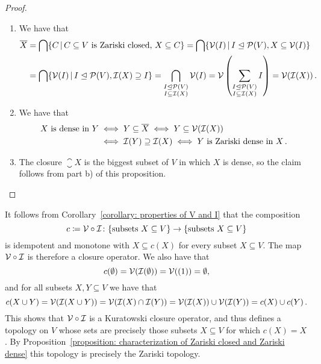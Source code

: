 \begin{proof}
  \leavevmode
  \begin{enumerate}
    \item
      We have that
      \begin{align*}
            \closure{X}
        &=  \bigcap \{ C \suchthat \text{$C \subseteq V$ is Zariski closed, $X \subseteq C$} \}
         =  \bigcap \{ \mc{V}(I) \suchthat I \idealeq \mc{P}(V), X \subseteq \mc{V}(I) \} \\
        &=  \bigcap \{ \mc{V}(I) \suchthat I \idealeq \mc{P}(V), \mc{I}(X) \supseteq I \}
         =  \bigcap_{\substack{I \idealeq \mc{P}(V) \\ I \subseteq \mc{I}(X)}} \mc{V}(I)
         =  \mc{V}\left( \sum_{\substack{I \idealeq \mc{P}(V) \\ I \subseteq \mc{I}(X)}} I \right)
         =  \mc{V}(\mc{I}(X)) \,.
      \end{align*}
    \item
      We have that
      \begin{align*}
              \text{$X$ is dense in $Y$}
        &\iff Y \subseteq \overline{X}
         \iff Y \subseteq \mathcal{V}(\mathcal{I}(X)) \\
        &\iff \mathcal{I}(Y) \supseteq \mathcal{I}(X)
         \iff \text{$Y$ is Zariski dense in $X$} \,.
      \end{align*}
    \item
      The closure $\closure{X}$ is the biggest subset of $V$ in which $X$ is dense, so the claim follows from part b) of this proposition.
    \qedhere
  \end{enumerate}
\end{proof}


\begin{remark}
  It follows from Corollary~\ref{corollary: properties of V and I} that the composition
  \[
              c
    \coloneqq  \mathcal{V} \circ \mathcal{I}
    \colon    \{ \text{subsets $X \subseteq V$} \}
    \to       \{ \text{subsets $X \subseteq V$} \}
  \]
  is idempotent and monotone with $X \subseteq c(X)$ for every subset $X \subseteq V$.
  The map $\mathcal{V} \circ \mathcal{I}$ is therefore a closure operator.
  We also have that
  \[
      c(\emptyset)
    = \mathcal{V}(\mathcal{I}(\emptyset))
    = \mathcal{V}((1))
    = \emptyset,
  \]
  and for all subsets $X, Y \subseteq V$ we have that
  \[
      c(X \cup Y)
    = \mathcal{V}(\mathcal{I}(X \cup Y))
    = \mathcal{V}(\mathcal{I}(X) \cap \mathcal{I}(Y))
    = \mathcal{V}(\mathcal{I}(X)) \cup \mathcal{V}(\mathcal{I}(Y))
    = c(X) \cup c(Y) \,.
  \]
  This shows that $\mathcal{V} \circ \mathcal{I}$ is a Kuratowski closure operator, and thus defines a topology on $V$ whose sets are precisely those subsets $X \subseteq V$ for which $c(X) = X$.
  By Proposition~\ref{proposition: characterization of Zariski closed and Zariski dense} this topology is precisely the Zariski topology.
\end{remark}



